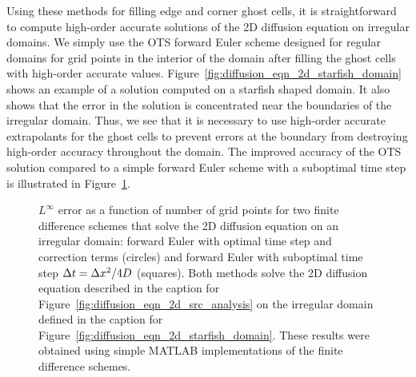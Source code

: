 \documentclass[oneeqnum,onefignum,onetabnum,onethmnum]{siamltex}
\begin{document}
Using these methods for filling edge and corner ghost cells, it is 
straightforward to compute high-order accurate solutions of the 2D diffusion 
equation on irregular domains.  We simply use the OTS forward Euler scheme 
designed for regular domains for grid points in the interior of the domain
after filling the ghost cells with high-order accurate values.  
Figure~\ref{fig:diffusion_eqn_2d_starfish_domain} shows an example of 
a solution computed on a starfish shaped domain.  It also shows that the 
error in the solution is concentrated near the boundaries of the irregular
domain.  Thus, we see that it is necessary to use high-order accurate 
extrapolants for the ghost cells to prevent errors at the boundary from 
destroying high-order accuracy throughout the domain.  The improved accuracy 
of the OTS solution compared to a simple forward Euler scheme with a 
suboptimal time step is illustrated in 
Figure~\ref{fig:diffusion_eqn_2d_starfish_error}. 

\begin{figure}[tb]
\begin{center}
\caption{$L^\infty$ error as a function of number of grid points for two
finite difference schemes that solve the 2D diffusion equation on an 
irregular domain: forward Euler with optimal time step and correction 
terms (circles) and forward Euler with suboptimal time step $\Delta t = \Delta x^2/4 D$
(squares).  Both methods solve the 2D diffusion equation described in the 
caption for Figure~\ref{fig:diffusion_eqn_2d_src_analysis} on the irregular
domain defined in the caption for 
Figure~\ref{fig:diffusion_eqn_2d_starfish_domain}.
These results were obtained using simple MATLAB implementations of the 
finite difference schemes.
}
\label{fig:diffusion_eqn_2d_starfish_error}
\end{center}
\end{figure}
\end{document}
